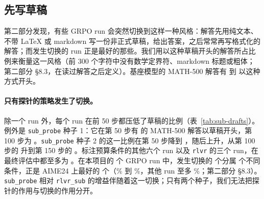 \subsection{先写草稿}\label{sec:res-style}

第二部分发现，有些 GRPO run 会突然切换到这样一种风格：解答先用纯文本、不带 LaTeX 或 markdown 写一份非正式草稿，给出答案，之后常常再写格式化的解答；而发生切换的 run 正是最好的那些。我们用以这种草稿开头的解答所占比例来衡量这一风格（前 300 个字符中没有数学定界符、markdown 标题或粗体；第二部分 \S8.3，在读过解答之后定义）。基座模型的 MATH-500 解答有  到  以这种方式开头。

\paragraph{只有探针的策略发生了切换。} 除一个 run 外，每个 run 在前 50 步都压低了草稿的比例（表~\ref{tab:sub-drafts}）。例外是 \texttt{sub\_probe} 种子 1：它在第 50 步有  的 MATH-500 解答以草稿开头，第 100 步为 。\texttt{sub\_probe} 种子 2 的这一比例在第 50 步降到 ，随后上升，从第 100 步的  升到第 150 步的 。标注预算条件的其他六个 run 以及 \texttt{rlvr} 的三个 run，在最终评估中都至多为 。在本项目的  个 GRPO run 中，发生切换的  个分属  个不同条件，正是 AIME24 上最好的  个（\% 到 \%，其他 run 至多 \%；第二部分 \S8.3）。\texttt{sub\_probe} 相对 \texttt{rlvr\_sub} 的增益伴随着这一切换；只有两个种子，我们无法把探针的作用与切换的作用分开。

\begin{table}[t]
\centering\small

\caption{以非正式草稿开头的 MATH-500 解答所占比例：每次定期评估（贪心，每 50 步）和最终评估，逐个 run 列出，并附最终准确率。}
\label{tab:sub-drafts}
\end{table}

